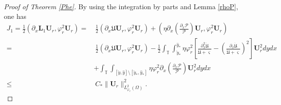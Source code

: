 \documentclass{amsart}
\numberwithin{equation}{section}
\begin{document}
\begin{proof}[Proof of Theorem \ref{Phe}]
By using the integration by parts and Lemma \ref{rhoP}, one has
\begin{align*}
J_{1}
=\frac{1}{2}(\partial_{x}\mathbf{L}_{1}\mathbf{U}_{r},\varphi_{r}^{2}\mathbf{U}_{r})
=&~\frac{1}{2}(\partial_{x}\mathfrak{U}\mathbf{U}_{r},\varphi_{r}^{2}\mathbf{U}_{r})
  +\left(\eta\partial_{x}\left(\frac{\partial_{x}\mathcal{P}}{\mathcal{P}}\right)\mathbf{U}_{r},\varphi_{r}^{2}\mathbf{U}_{r}\right)\\
=&~\frac{1}{2}(\partial_{x}\mathfrak{U}\mathbf{U}_{r},\varphi_{r}^{2}\mathbf{U}_{r})
  -\frac{1}{2}\int_{\mathbb{T}}\int_{\check{y}_{*}}^{\hat{y}_{*}}\eta\varphi_{r}^{2}\left[\frac{\partial_{x}^{2}\dot{\mathfrak{U}}}{\dot{\mathfrak{U}}+\varsigma}-\left(\frac{\partial_{x}\dot{\mathfrak{U}}}{\dot{\mathfrak{U}}+\varsigma}\right)^{2}\right]\mathbf{U}_{r}^{2}dydx\\
 &+\int_{\mathbb{T}}\int_{[\check{y},\hat{y}]\setminus[\check{y}_{*},\hat{y}_{*}]}\eta\varphi_{r}^{2}\partial_{x}\left(\frac{\partial_{x}\mathcal{P}}{\mathcal{P}}\right)\mathbf{U}_{r}^{2}dydx\\
\leq&~C_{*}\|\mathbf{U}_{r}\|_{L_{\varphi_{r}}^{2}(\Omega)}^{2}.
\end{align*}




\end{proof}
\end{document}
